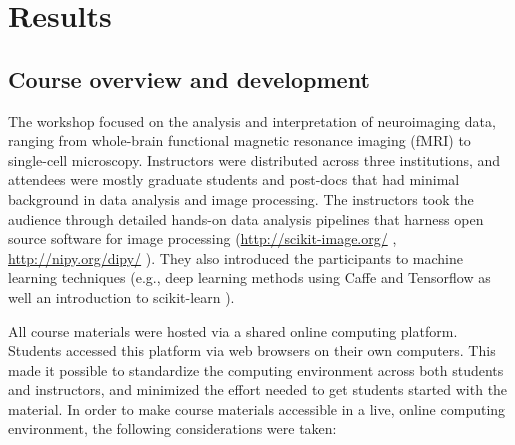 \section{Results}

\subsection{Course overview and development}

The workshop focused on the analysis and interpretation of neuroimaging data,
ranging from whole-brain functional magnetic resonance imaging (fMRI) to
single-cell microscopy. Instructors were distributed across three institutions,
and attendees were mostly graduate students and post-docs that had minimal
background in data analysis and image processing. The instructors took the
audience through detailed hands-on data analysis pipelines that harness open
source software for image processing  (\url{http://scikit-image.org/}
\cite{van2014scikit}, \url{http://nipy.org/dipy/}
\cite{Garyfallidis2014FrontNeuroinf}). They also introduced the participants to
machine learning techniques (e.g., deep learning methods using Caffe
\cite{jia2014caffe} and Tensorflow \cite{abadi2016tensorflow} as well an
introduction to scikit-learn \cite{Pedregosa2012-dm}).

All course materials were hosted via a shared online computing platform.
Students accessed this platform via web browsers on their own computers.
This made it possible to standardize the computing environment across both
students and instructors, and minimized the effort needed to get students
started with the material. In order to make course materials accessible in a
live, online computing environment, the following considerations were taken:

